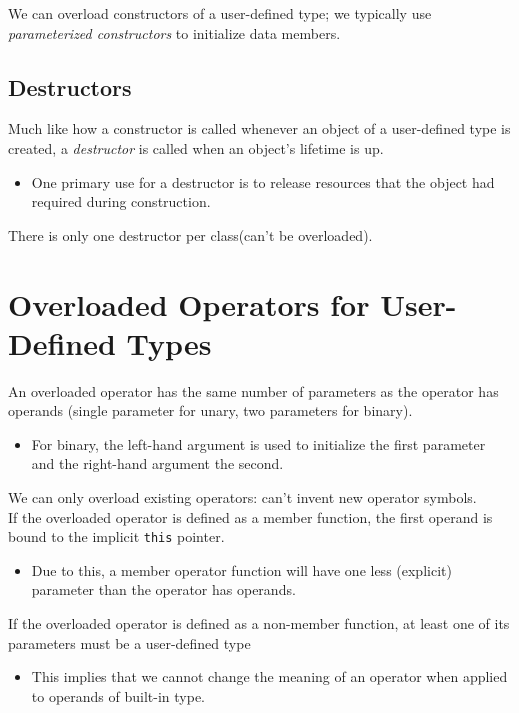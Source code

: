\documentclass{article}
\begin{document}
	We can overload constructors of a user-defined type; we typically use \textit{parameterized constructors} to initialize data members.
	
	\subsection*{Destructors}
	
	Much like how a constructor is called whenever an object of a user-defined type is created, a \textit{destructor} is called when an object's lifetime is up.
	\begin{itemize}
		\item One primary use for a destructor is to release resources that the object had required during construction.
	\end{itemize}

	There is only one destructor per class(can't be overloaded).
	
	
	\section{Overloaded Operators for User-Defined Types}
	
	An overloaded operator has the same number of parameters as the operator has operands (single parameter for unary, two parameters for binary).
	\begin{itemize}
		\item For binary, the left-hand argument is used to initialize the first parameter and the right-hand argument the second.
	\end{itemize}
	
	We can only overload existing operators: can't invent new operator symbols.\\
	
	If the overloaded operator is defined as a member function, the first operand is bound to the implicit \verb|this| pointer.
	\begin{itemize}
		\item Due to this, a member operator function will have one less (explicit) parameter than the operator has operands.
	\end{itemize}

	If the overloaded operator is defined as a non-member function, at least one of its parameters must be a user-defined type
	\begin{itemize}
		\item This implies that we cannot change the meaning of an operator when applied to operands of built-in type.
	\end{itemize}


	



	
	
	
	
	
	
	
	
	
	
	
	
	
	
\end{document}
